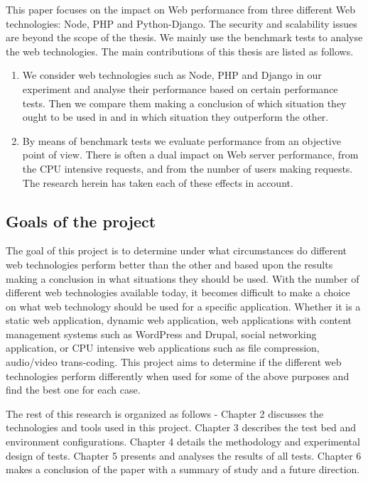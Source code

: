 \documentclass[../thesis.tex]{subfiles}
\begin{document}
This paper focuses on the impact on Web performance from three different Web technologies: Node, PHP and Python-Django. The security and scalability issues are beyond the scope of the thesis. We mainly use the benchmark tests to analyse the web technologies. The main contributions of this thesis are listed as follows. 
\vspace{5mm}
\begin{enumerate}
    \item We consider web technologies such as Node, PHP and Django in our experiment and analyse their performance based on certain performance tests. Then we compare them making a conclusion of which situation they ought to be used in and in which situation they outperform the other. 
    \item By means of benchmark tests we evaluate performance from an objective point of view. There is often a dual impact on Web server performance, from the CPU intensive requests, and from the number of users making requests. The research herein has taken each of these effects in account.
\end{enumerate}
\subsection{Goals of the project}
The goal of this project is to determine under what circumstances do different web technologies perform better than the other and based upon the results making a conclusion in what situations they should be used. With the number of different web technologies available today, it becomes difficult to make a choice on what web technology should be used for a specific application. Whether it is a static web application, dynamic web application, web applications with content management systems such as WordPress and Drupal, social networking application, or CPU intensive web applications such as file compression, audio/video trans-coding. This project aims to determine if the different web technologies perform differently when used for some of the above purposes and find the best one for each case.
\linebreak

The rest of this research is organized as follows - Chapter 2 discusses the technologies and tools used in this project. Chapter 3 describes the test bed and environment configurations. Chapter 4 details the methodology and experimental design of tests. Chapter 5 presents and analyses the results of all tests. Chapter 6 makes a conclusion of the paper with a summary of study and a future direction.
\end{document}
